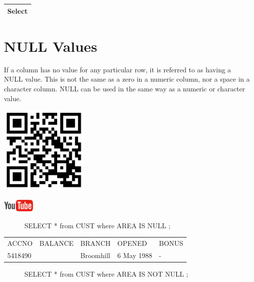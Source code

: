 \begin{flushleft}
\tablefirsthead{}
\tablehead{}
\tabletail{}
\tablelasttail{}
\begin{supertabular}{|m{14.583cm}|}
\hline
Select

\\\hline
\end{supertabular}
\end{flushleft}
\section{NULL Values}
If a column has no value for any particular row, it is referred to as having a NULL value. This is not the same as a zero in a numeric column, nor a space in a character column.  NULL can be used in the same way as a numeric or character value.



\begin{center}
\begin{minipage}{4.849cm}
   
\includegraphics[width=4.341cm,height=4.341cm]{images/img (32).png}
 

   
\includegraphics[width=1.582cm,height=0.674cm]{images/img (15).png}
 
\end{minipage}
\end{center}
\ \ \ \ \ \ SELECT * from CUST where AREA IS NULL ;

\begin{flushleft}
\tablefirsthead{}
\tablehead{}
\tabletail{}
\tablelasttail{}
\begin{supertabular}{|m{1.9909999cm}|m{2.3009999cm}|m{2.0509999cm}|m{2.55cm}|m{1.8cm}|}
\hline
ACCNO &
BALANCE

 &
BRANCH &
OPENED &
BONUS\\
5418490 &
 &
Broomhill &
6 May 1988 &
\centering\arraybslash {}-\\\hline
\end{supertabular}
\end{flushleft}
\ \ \ \ \ \ SELECT * from CUST where AREA IS NOT NULL ;

